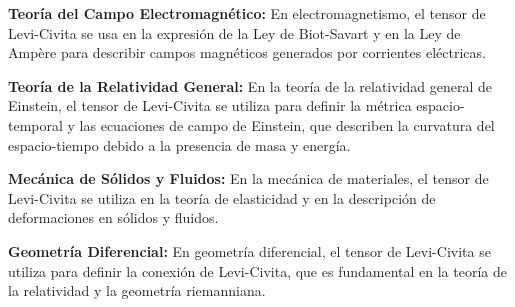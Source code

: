 \textbf{Teoría del Campo Electromagnético:} En electromagnetismo, el tensor de Levi-Civita se usa en la expresión de la Ley de Biot-Savart y en la Ley de Ampère para describir campos magnéticos generados por corrientes eléctricas.

\textbf{Teoría de la Relatividad General:} En la teoría de la relatividad general de Einstein, el tensor de Levi-Civita se utiliza para definir la métrica espacio-temporal y las ecuaciones de campo de Einstein, que describen la curvatura del espacio-tiempo debido a la presencia de masa y energía.

\textbf{Mecánica de Sólidos y Fluidos:} En la mecánica de materiales, el tensor de Levi-Civita se utiliza en la teoría de elasticidad y en la descripción de deformaciones en sólidos y fluidos.

\textbf{Geometría Diferencial:} En geometría diferencial, el tensor de Levi-Civita se utiliza para definir la conexión de Levi-Civita, que es fundamental en la teoría de la relatividad y la geometría riemanniana.